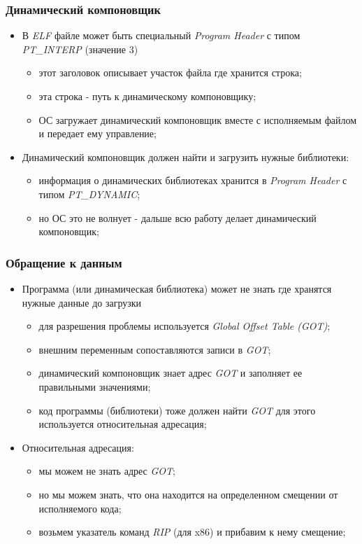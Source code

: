 \begin{frame}
\frametitle{Динамический компоновщик}
\begin{itemize}
  \item<1-> В \emph{ELF} файле может быть специальный \emph{Program Header} с типом \emph{PT\_INTERP} (значение 3)
    \begin{itemize}
      \item этот заголовок описывает участок файла где хранится строка;
      \item эта строка - путь к динамическому компоновщику;
      \item ОС загружает динамический компоновщик вместе с исполняемым файлом и передает ему управление;
    \end{itemize}
  \item<2-> Динамический компоновщик должен найти и загрузить нужные библиотеки:
    \begin{itemize}
      \item информация о динамических библиотеках хранится в \emph{Program Header} с типом \emph{PT\_DYNAMIC};
      \item но ОС это не волнует - дальше всю работу делает динамический компоновщик;
    \end{itemize}
\end{itemize}
\end{frame}

\begin{frame}
\frametitle{Обращение к данным}
\begin{itemize}
  \item<1-> Программа (или динамическая библиотека) может не знать где хранятся нужные данные до загрузки
    \begin{itemize}
      \item для разрешения проблемы используется \emph{Global Offset Table (GOT)};
      \item внешним переменным сопоставляются записи в \emph{GOT};
      \item динамический компоновщик знает адрес \emph{GOT} и заполняет ее правильными значениями;
      \item код программы (библиотеки) тоже должен найти \emph{GOT} для этого используется относительная адресация;
    \end{itemize}
  \item<2-> Относительная адресация:
    \begin{itemize}
      \item мы можем не знать адрес \emph{GOT};
      \item но мы можем знать, что она находится на определенном смещении от исполняемого кода;
      \item возьмем указатель команд \emph{RIP} (для x86) и прибавим к нему смещение;
    \end{itemize}
\end{itemize}
\end{frame}

